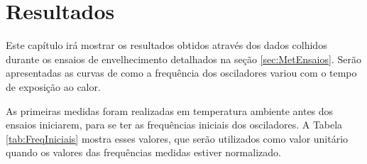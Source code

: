 \chapter{Resultados}
\label{sec:Resultados}

Este capítulo irá mostrar os resultados obtidos através dos dados colhidos durante os ensaios de envelhecimento detalhados na seção \ref{sec:MetEnsaios}. Serão apresentadas as curvas de como a frequência dos osciladores variou com o tempo de exposição ao calor.

As primeiras medidas foram realizadas em temperatura ambiente antes dos ensaios iniciarem, para se ter as frequências iniciais dos osciladores. A Tabela \ref{tab:FreqIniciais} mostra esses valores, que serão utilizados como valor unitário quando os valores das frequências medidas estiver normalizado.












